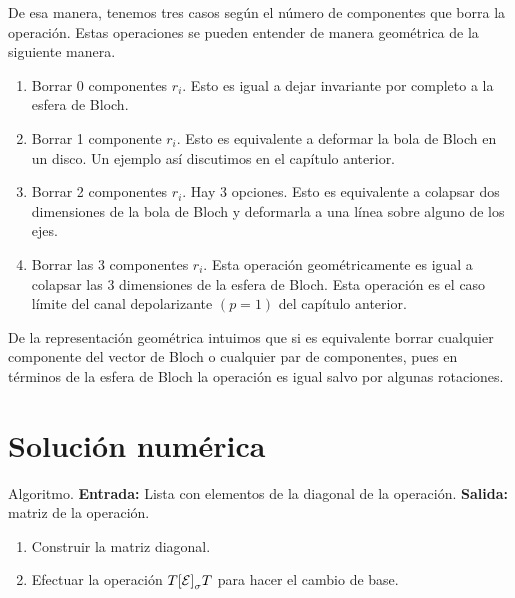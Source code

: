 De esa manera, tenemos tres casos según el número de componentes
que borra la operación. Estas operaciones se pueden entender 
de manera geométrica de la siguiente manera. 
\begin{enumerate}
\item Borrar 0 componentes $r_i$. Esto es igual a dejar invariante 
por completo a la esfera de Bloch. 
\item Borrar 1 componente $r_i$. Esto es equivalente a deformar la bola 
de Bloch en un disco. Un ejemplo así discutimos en el capítulo 
anterior. 
\item Borrar 2 componentes $r_i$. Hay 3 opciones. Esto es equivalente
a colapsar dos dimensiones de la bola de Bloch y deformarla a
una línea sobre alguno de los ejes. 
\item Borrar las 3 componentes $r_i$. Esta operación geométricamente 
es igual a colapsar las 3 dimensiones de la esfera de Bloch. 
Esta operación es el caso límite del canal depolarizante $(p=1)$
del capítulo anterior. 
\end{enumerate}
De la representación geométrica intuimos que si es equivalente 
borrar cualquier componente del vector de Bloch o cualquier par
de componentes, pues en términos de la esfera de Bloch 
la operación es igual salvo por algunas rotaciones.
\section{Solución numérica} %





Algoritmo. \textbf{Entrada:} Lista con elementos de la diagonal de
la operación. \textbf{Salida:} matriz de la operación.
\begin{enumerate}
\item Construir la matriz diagonal.
\item Efectuar la operación $T\qty[\mathcal{E}]_{\sigma}T$ para hacer
el cambio de base.
\end{enumerate}

